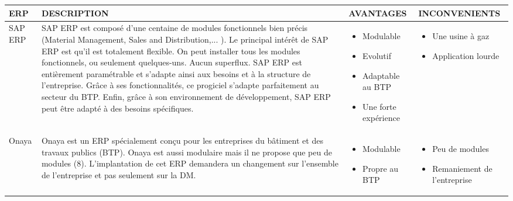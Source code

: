 \begin{center}
\begin{tabular}{|p{1cm}|p{7cm}|p{3.3cm}|p{3.3cm}|}
\hline
ERP & DESCRIPTION & AVANTAGES & INCONVENIENTS\\ \hline

SAP ERP   &
SAP ERP est composé d’une centaine de modules fonctionnels bien précis (Material Management, Sales and Distribution,... ). 
Le principal intérêt de SAP ERP est qu’il est totalement flexible. On peut installer tous les modules fonctionnels, ou seulement quelques-uns. 
Aucun superflux. SAP ERP est entièrement paramétrable et s'adapte ainsi aux besoins et à la structure de l'entreprise. 
Grâce à ses fonctionnalités, ce progiciel s’adapte parfaitement au secteur du BTP. 
Enfin, grâce à son environnement de développement, SAP ERP peut être adapté à des besoins spécifiques. &
\begin{itemize}
  \item Modulable
  \item Evolutif 
  \item Adaptable au BTP 
  \item Une forte expérience 
 \end{itemize} &
  \begin{itemize}
  \item Une usine à gaz
  \item Application lourde
 \end{itemize}\\ \hline
 
 
Onaya   &
Onaya est un ERP spécialement conçu pour les entreprises du bâtiment et des travaux publics (BTP).
Onaya est aussi modulaire mais il ne propose que peu de modules (8). 
L’implantation de cet ERP demandera un changement sur l’ensemble de l’entreprise et pas seulement sur la DM. &
\begin{itemize}
  \item Modulable
  \item Propre au BTP
 \end{itemize} &
  \begin{itemize}
  \item Peu de modules
  \item Remaniement de l'entreprise 
 \end{itemize}\\ \hline
 

\end{tabular}
\end{center}
